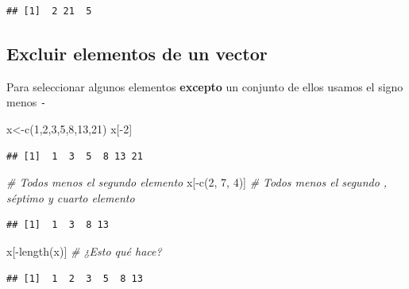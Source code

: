 \documentclass[
]{book}
\newenvironment{Shaded}{\begin{snugshade}}{\end{snugshade}}
\newcommand{\CommentTok}[1]{\textcolor[rgb]{0.56,0.35,0.01}{\textit{#1}}}
\newcommand{\DecValTok}[1]{\textcolor[rgb]{0.00,0.00,0.81}{#1}}
\newcommand{\FunctionTok}[1]{\textcolor[rgb]{0.00,0.00,0.00}{#1}}
\newcommand{\NormalTok}[1]{#1}
\newcommand{\OtherTok}[1]{\textcolor[rgb]{0.56,0.35,0.01}{#1}}
\newcommand{\SpecialCharTok}[1]{\textcolor[rgb]{0.00,0.00,0.00}{#1}}
\begin{document}
\begin{verbatim}
## [1]  2 21  5
\end{verbatim}

\hypertarget{excluir-elementos-de-un-vector}{%
\subsection{Excluir elementos de un vector}\label{excluir-elementos-de-un-vector}}

Para seleccionar algunos elementos \textbf{excepto} un conjunto de ellos usamos
el signo menos \texttt{-}

\begin{Shaded}
\begin{Highlighting}[]
\NormalTok{x}\OtherTok{\textless{}{-}}\FunctionTok{c}\NormalTok{(}\DecValTok{1}\NormalTok{,}\DecValTok{2}\NormalTok{,}\DecValTok{3}\NormalTok{,}\DecValTok{5}\NormalTok{,}\DecValTok{8}\NormalTok{,}\DecValTok{13}\NormalTok{,}\DecValTok{21}\NormalTok{)}
\NormalTok{x[}\SpecialCharTok{{-}}\DecValTok{2}\NormalTok{]}
\end{Highlighting}
\end{Shaded}

\begin{verbatim}
## [1]  1  3  5  8 13 21
\end{verbatim}

\begin{Shaded}
\begin{Highlighting}[]
\CommentTok{\# Todos menos el segundo elemento}
\NormalTok{x[}\SpecialCharTok{{-}}\FunctionTok{c}\NormalTok{(}\DecValTok{2}\NormalTok{, }\DecValTok{7}\NormalTok{, }\DecValTok{4}\NormalTok{)]   }\CommentTok{\# Todos menos el segundo , séptimo y cuarto elemento}
\end{Highlighting}
\end{Shaded}

\begin{verbatim}
## [1]  1  3  8 13
\end{verbatim}

\begin{Shaded}
\begin{Highlighting}[]
\NormalTok{x[}\SpecialCharTok{{-}}\FunctionTok{length}\NormalTok{(x)]    }\CommentTok{\# ¿Esto qué hace?}
\end{Highlighting}
\end{Shaded}

\begin{verbatim}
## [1]  1  2  3  5  8 13
\end{verbatim}
\end{document}
